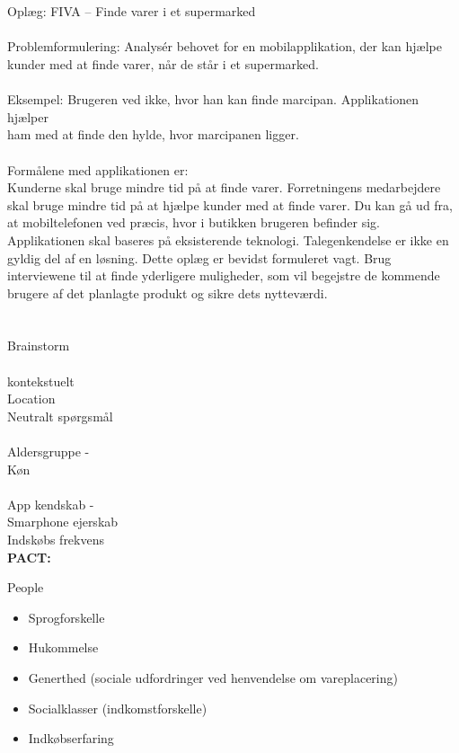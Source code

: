 \documentclass[12pt]{article}
\begin{document}
\section*{}
Oplæg: FIVA – Finde varer i et supermarked\\
\\
Problemformulering: Analysér behovet for en mobilapplikation, der kan hjælpe kunder med at finde varer, når de står i et
supermarked.\\
\\
Eksempel: Brugeren ved ikke, hvor han kan finde marcipan. Applikationen hjælper\\
ham med at finde den hylde, hvor marcipanen ligger.\\
\\
Formålene med applikationen er:\\
Kunderne skal bruge mindre tid på at finde varer.
Forretningens medarbejdere skal bruge mindre tid på at hjælpe kunder med at finde varer. Du kan gå ud fra, at mobiltelefonen ved præcis, hvor i butikken brugeren befinder sig. Applikationen skal baseres på eksisterende teknologi. Talegenkendelse er ikke en gyldig del af en løsning. Dette oplæg er bevidst formuleret vagt. Brug interviewene til at finde yderligere muligheder, som vil begejstre de kommende brugere af det planlagte produkt og sikre dets nytteværdi.

\section*{}

Brainstorm\\
\\
kontekstuelt\\
Location\\
Neutralt sp\o rgsm\aa l\\
\\
Aldersgruppe - \\ 
K\o n\\
\\
App kendskab - \\
Smarphone ejerskab\\
Indsk\o bs frekvens\\

\textbf{PACT:}

People
\begin{itemize}
\item Sprogforskelle
\item Hukommelse
\item Generthed (sociale udfordringer ved henvendelse om vareplacering)
\item Socialklasser (indkomstforskelle)
\item Indkøbserfaring
\end{itemize}
\end{document}
